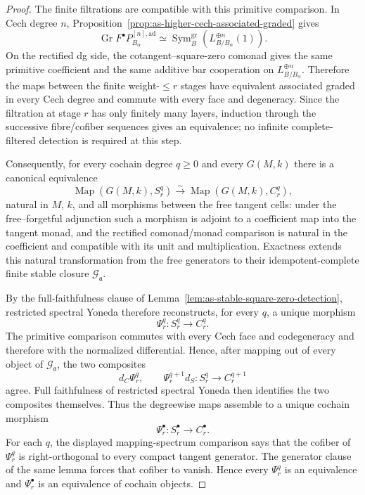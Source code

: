 \begin{proof}
The finite filtrations are compatible with this primitive comparison.  In
Cech degree $n$,
Proposition~\ref{prop:as-higher-cech-associated-graded} gives
\[
    \operatorname{Gr}
    F^\bullet P_{B_\alpha}^{[n],\mathrm{ad}}
    \simeq
    \operatorname{Sym}^{\mathrm{gr}}_B
    \left(
        L_{B/B_\alpha}^{\oplus n}(1)
    \right).
\]
On the rectified dg side, the cotangent--square-zero comonad gives the same
primitive coefficient and the same additive bar cooperation on
$L_{B/B_\alpha}^{\oplus n}$.  Therefore the maps between the finite
weight-$\le r$ stages have equivalent associated graded in every Cech degree
and commute with every face and degeneracy.  Since the filtration at stage
$r$ has only finitely many layers, induction through the successive
fibre/cofiber sequences gives an equivalence; no infinite complete-filtered
detection is required at this step.

Consequently, for every cochain degree $q\geq0$ and every $G(M,k)$ there is
a canonical equivalence
\[
\boxed{
    \operatorname{Map}
    \left(G(M,k),S_r^q\right)
    \xrightarrow{\sim}
    \operatorname{Map}
    \left(G(M,k),C_r^q\right),
}
\]
natural in $M$, $k$, and all morphisms between the free tangent cells:
under the free--forgetful adjunction such a morphism is adjoint to a
coefficient map into the tangent monad, and the rectified comonad/monad
comparison is natural in the coefficient and compatible with its unit and
multiplication.  Exactness extends this natural transformation from the free
generators to their idempotent-complete finite stable closure
$\mathcal G_{\mathfrak a}$.

By the full-faithfulness clause of
Lemma~\ref{lem:as-stable-square-zero-detection}, restricted spectral Yoneda
therefore reconstructs, for every $q$, a unique morphism
\[
\boxed{
    \Psi_r^q:S_r^q\longrightarrow C_r^q.
}
\]
The primitive comparison commutes with every Cech face and codegeneracy and
therefore with the normalized differential.  Hence, after mapping out of
every object of $\mathcal G_{\mathfrak a}$, the two composites
\[
    d_C\Psi_r^q,
    \qquad
    \Psi_r^{q+1}d_S:
    S_r^q\longrightarrow C_r^{q+1}
\]
agree.  Full faithfulness of restricted spectral Yoneda then identifies the
two composites themselves.  Thus the degreewise maps assemble to a unique
cochain morphism
\[
\boxed{
    \Psi_r^\bullet:
    S_r^\bullet\longrightarrow C_r^\bullet.
}
\]
For each $q$, the displayed mapping-spectrum comparison says that the cofiber
of $\Psi_r^q$ is right-orthogonal to every compact tangent generator.  The
generator clause of the same lemma forces that cofiber to vanish.  Hence every
$\Psi_r^q$ is an equivalence and $\Psi_r^\bullet$ is an equivalence of
cochain objects.


\end{proof}
